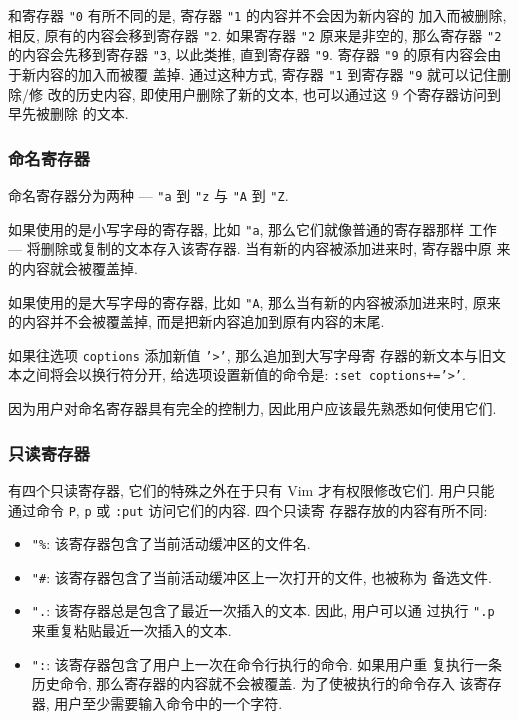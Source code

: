 和寄存器 \texttt{"0} 有所不同的是, 寄存器 \texttt{"1} 的内容并不会因为新内容的
加入而被删除, 相反, 原有的内容会移到寄存器 \texttt{"2}. 如果寄存器 \texttt{"2}
原来是非空的, 那么寄存器 \texttt{"2} 的内容会先移到寄存器 \texttt{"3}, 以此类推,
直到寄存器 \texttt{"9}. 寄存器 \texttt{"9} 的原有内容会由于新内容的加入而被覆
盖掉. 通过这种方式, 寄存器 \texttt{"1} 到寄存器 \texttt{"9} 就可以记住删除/修
改的历史内容, 即使用户删除了新的文本, 也可以通过这 9 个寄存器访问到早先被删除
的文本.

\subsubsection{命名寄存器}
\label{subsubsec:the_named_registers}

命名寄存器分为两种 --- \texttt{"a} 到 \texttt{"z} 与 \texttt{"A} 到
\texttt{"Z}.

如果使用的是小写字母的寄存器, 比如 \texttt{"a}, 那么它们就像普通的寄存器那样
工作 --- 将删除或复制的文本存入该寄存器. 当有新的内容被添加进来时, 寄存器中原
来的内容就会被覆盖掉.

如果使用的是大写字母的寄存器, 比如 \texttt{"A}, 那么当有新的内容被添加进来时,
原来的内容并不会被覆盖掉, 而是把新内容追加到原有内容的末尾.

\begin{warning}
    如果往选项 \texttt{coptions} 添加新值 \texttt{'>'}, 那么追加到大写字母寄
    存器的新文本与旧文本之间将会以换行符分开, 给选项设置新值的命令是:
    \texttt{:set coptions+='>'}.
\end{warning}

因为用户对命名寄存器具有完全的控制力, 因此用户应该最先熟悉如何使用它们.

\subsubsection{只读寄存器}
\label{subsubsec:the_read_only_registers}

有四个只读寄存器, 它们的特殊之外在于只有 Vim 才有权限修改它们. 用户只能
通过命令 \texttt{P}, \texttt{p} 或 \texttt{:put} 访问它们的内容. 四个只读寄
存器存放的内容有所不同:
\begin{itemize}
    \item \texttt{"\%}: 该寄存器包含了当前活动缓冲区的文件名.
    \item \texttt{"\#}: 该寄存器包含了当前活动缓冲区上一次打开的文件, 也被称为
        备选文件.
    \item \texttt{".}: 该寄存器总是包含了最近一次插入的文本. 因此, 用户可以通
        过执行 \texttt{".p} 来重复粘贴最近一次插入的文本.
    \item \texttt{":}: 该寄存器包含了用户上一次在命令行执行的命令. 如果用户重
    复执行一条历史命令, 那么寄存器的内容就不会被覆盖. 为了使被执行的命令存入
        该寄存器, 用户至少需要输入命令中的一个字符.
\end{itemize}

